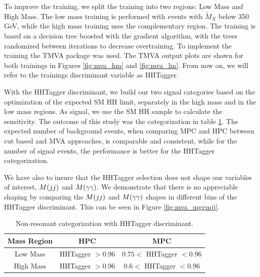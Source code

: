 To improve the training, we split the training into two regions: Low Mass and High Mass. 
The low mass training is performed with events with $\tilde{M}_{X}$ below 350 GeV, while the high mass training uses the complementary region. 
The training is based on a decision tree boosted with the gradient algorithm, with the trees randomized between iterations to decrease overtraining. 
To implement the training the TMVA package was used. 
The TMVA output plots are shown for both trainings in Figures \ref{fig:mva_hm} and \ref{fig:mva_lm}. 
From now on, we will refer to the trainings discriminant variable as HHTagger.

With the HHTagger discriminant, we build our two signal categories based on the optimization of the expected SM HH limit, separately in the high mass and in the low mass regions. 
As signal, we use the SM HH sample to calculate the sensitivity. 
The outcome of this study was the categorization in table \ref{tab:catmva}. 
The expected number of background events, when comparing MPC and HPC between cut based and MVA approaches, is comparable and consistent, while for the number of signal events, the performance is better for the HHTagger categorization. 

We have also to insure that the HHTagger selection does not shape our variables of interest, $M(jj)$ and $M(\gamma\gamma)$. 
We demonstrate that there is no appreciable shaping by comparing the $M(jj)$ and $M(\gamma\gamma)$ shapes in different bins of the HHTagger discriminant. 
This can be seen in Figure \ref{fig:mva_mggmjj}. 

\begin{table}
\centering
    \begin{tabular}{| c | c | c |}
    \hline
    Mass Region & HPC & MPC \\ \hline
    Low Mass & HHTagger $> 0.96$ & $ 0.75 < $ HHTagger $ < 0.96 $ \\ \hline 
    High Mass & HHTagger $> 0.96$ & $ 0.6 < $ HHTagger $ < 0.96 $ \\ \hline 
    \end{tabular}
\caption{Non-resonant categorization with HHTagger discriminant.}
\label{tab:catmva}
\end{table}


